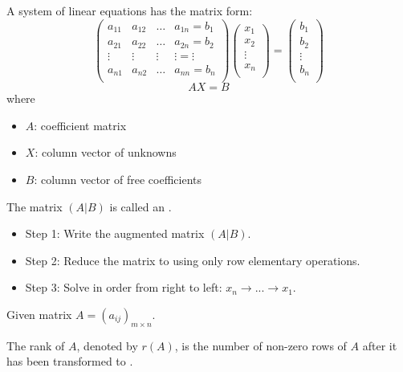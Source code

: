     \par A system of linear equations has the matrix form:
    \[
      \begin{pmatrix}
        a_{11} & a_{12} & \ldots & a_{1n} = b_{1} \\
        a_{21} & a_{22} & \ldots & a_{2n} = b_{2} \\
        \vdots & \vdots & \vdots & \vdots = \vdots \\
        a_{n1} & a_{n2} & \ldots & a_{nn} = b_{n} \\
      \end{pmatrix}
      \begin{pmatrix}
        x_{1} \\
        x_{2} \\
        \vdots \\
        x_{n} \\
      \end{pmatrix}
      =
      \begin{pmatrix}
        b_{1} \\
        b_{2} \\
        \vdots \\
        b_{n} \\
      \end{pmatrix}
    \]
    \[
      AX = B
    \]
    where
    \begin{itemize}
      \item $A$: coefficient matrix
      \item $X$: column vector of unknowns
      \item $B$: column vector of free coefficients
    \end{itemize}
    
    \par The matrix $(A|B)$ is called an .

    \begin{itemize}
      \item Step 1: Write the augmented matrix $(A|B)$.
      \item Step 2: Reduce the matrix to  using only
        row elementary operations.
      \item Step 3: Solve in order from right to left: $x_{n} \to ... \to x_{1}$.
    \end{itemize}


    \par Given matrix $A = (a_{ij})_{m \times n}$.
    \par The rank of $A$, denoted by $r(A)$, is the number of non-zero rows of $A$
    after it has been transformed to .

